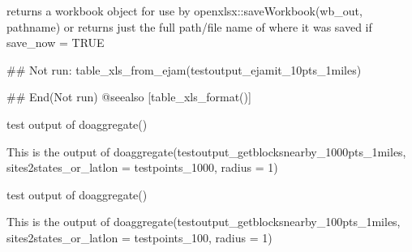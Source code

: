 \documentclass[a4paper]{book}
\begin{document}
%
\begin{Value}
returns a workbook object for use by openxlsx::saveWorkbook(wb\_out, pathname)
or returns just the full path/file name of where it was saved if save\_now = TRUE
\end{Value}
%
\begin{Examples}
\begin{ExampleCode}
## Not run: 
  table_xls_from_ejam(testoutput_ejamit_10pts_1miles)
  
## End(Not run)
 @seealso [table_xls_format()]
\end{ExampleCode}
\end{Examples}
%
\begin{Description}\relax
test output of doaggregate()
\end{Description}
%
\begin{Details}\relax
This is the output of doaggregate(testoutput\_getblocksnearby\_1000pts\_1miles, sites2states\_or\_latlon = testpoints\_1000, radius = 1)
\end{Details}
%
\begin{SeeAlso}\relax
{}   
\end{SeeAlso}
%
\begin{Description}\relax
test output of doaggregate()
\end{Description}
%
\begin{Details}\relax
This is the output of doaggregate(testoutput\_getblocksnearby\_100pts\_1miles, sites2states\_or\_latlon = testpoints\_100, radius = 1)
\end{Details}
%
\begin{SeeAlso}\relax
{}   
\end{SeeAlso}
\end{document}
